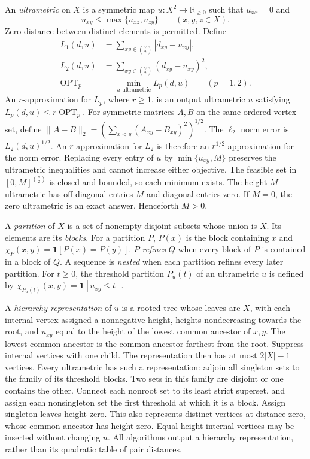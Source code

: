 \documentclass[11pt]{article}
\theoremstyle{definition}
\newcommand{\ind}{\mathbf 1}
\newcommand{\OPT}{\operatorname{OPT}}
\newcommand{\join}{\chi}
\begin{document}
An \emph{ultrametric} on $X$ is a symmetric map $u:X^2\to\mathbb R_{\ge0}$
such that $u_{xx}=0$ and
\[
 u_{xy}\le\max\{u_{xz},u_{zy}\}\qquad(x,y,z\in X).
\]
Zero distance between distinct elements is permitted. Define
\begin{align*}
 L_1(d,u)&=\sum_{xy\in\binom V2}|d_{xy}-u_{xy}|,\\
 L_2(d,u)&=\sum_{xy\in\binom V2}(d_{xy}-u_{xy})^2,\\
 \OPT_p&=\min_{u\text{ ultrametric}}L_p(d,u)\qquad(p=1,2).
\end{align*}
An $r$-approximation for $L_p$, where $r\ge1$, is an output ultrametric
$u$ satisfying $L_p(d,u)\le r\OPT_p$. For symmetric matrices $A,B$ on
the same ordered vertex set, define
$\|A-B\|_2=(\sum_{x<y}(A_{xy}-B_{xy})^2)^{1/2}$.
The $\ell_2$ norm error is $L_2(d,u)^{1/2}$. An $r$-approximation for
$L_2$ is therefore an $r^{1/2}$-approximation for the norm error.
Replacing every entry of $u$ by $\min\{u_{xy},M\}$ preserves the
ultrametric inequalities and cannot increase either objective. The feasible
set in $[0,M]^{\binom n2}$ is closed and bounded, so each minimum exists.
The height-$M$ ultrametric has off-diagonal entries $M$ and diagonal entries zero. If $M=0$, the zero ultrametric is an exact answer. Henceforth $M>0$.

A \emph{partition} of $X$ is a set of nonempty disjoint subsets whose union
is $X$. Its elements are its \emph{blocks}. For a partition $P$, $P(x)$ is
the block containing $x$ and $\join_P(x,y)=\ind[P(x)=P(y)]$.
$P$ \emph{refines} $Q$ when every block of $P$ is contained in a block of
$Q$. A sequence is \emph{nested} when each partition refines every later
partition. For $t\ge0$, the threshold partition $P_u(t)$ of an ultrametric $u$ is defined
by $\join_{P_u(t)}(x,y)=\ind[u_{xy}\le t]$.

A \emph{hierarchy representation} of $u$ is a rooted tree whose leaves are
$X$, with each internal vertex assigned a nonnegative height, heights
nondecreasing towards the root, and $u_{xy}$ equal to the height of the
lowest common ancestor of $x,y$. The lowest common ancestor is the common
ancestor farthest from the root. Suppress internal vertices with one child.
The representation then has at most $2|X|-1$ vertices. Every ultrametric has
such a representation: adjoin all singleton sets to the family of its
threshold blocks. Two sets in this family are disjoint or one contains
the other. Connect each nonroot set to its least strict superset, and
assign each nonsingleton set the first threshold at which it is a block.
Assign singleton leaves height zero. This also represents distinct
vertices at distance zero, whose common ancestor has height zero. Equal-height internal
vertices may be inserted without changing $u$. All algorithms output a
hierarchy representation, rather than its quadratic table of pair distances.
\end{document}

